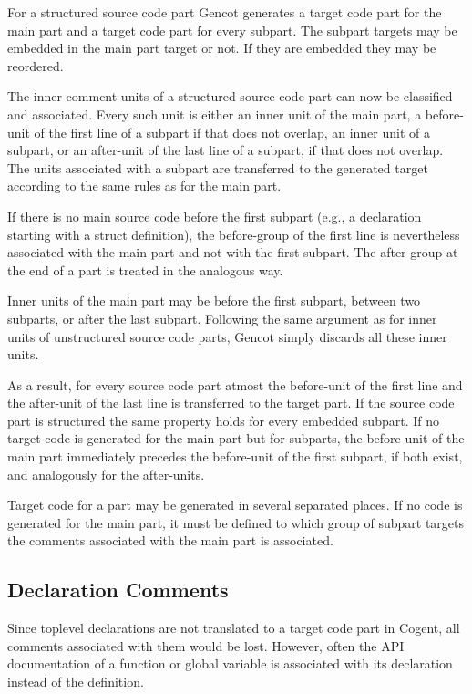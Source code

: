 For a structured source code part Gencot generates a target code part for the main part and a target code part for every 
subpart. The subpart targets may be embedded in the main part target or not. If they are embedded they may be reordered.

The inner comment units of a structured source code part can now be classified and associated. Every such unit is either
an inner unit of the main part, a before-unit of the first line of a subpart if that does not overlap, an inner 
unit of a subpart, or an after-unit of the last line of a subpart, if that does not overlap. The units associated with a subpart
are transferred to the generated target according to the same rules as for the main part. 

If there is no main source code before the first subpart (e.g., a declaration starting with a struct definition), the
before-group of the first line is nevertheless associated with the main part and not with the first subpart. The after-group
at the end of a part is treated in the analogous way.

Inner units of the main part may be before the first subpart, between two subparts, or after the last subpart. Following 
the same argument as for inner units of unstructured source code parts, Gencot simply discards all these inner units.

As a result, for every source code part atmost the before-unit of the first line and the after-unit of the last line 
is transferred to the target part. If the source code part is structured the same property holds for every embedded 
subpart. If no target code is generated for the main part but for subparts, the before-unit of the main part immediately
precedes the before-unit of the first subpart, if both exist, and analogously for the after-units.

Target code for a part may be generated in several separated places. If no code
is generated for the main part, it must be defined to which group of subpart targets the comments associated with the
main part is associated.

\subsection{Declaration Comments}
\label{design-comments-decl}

Since toplevel declarations are not translated to a target code part in Cogent, all comments associated with them would
be lost. However, often the API documentation of a function or global variable is associated with its declaration instead of the
definition. 

